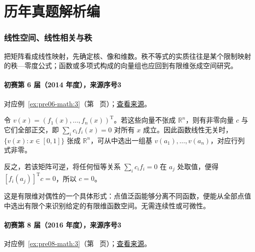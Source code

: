 \documentclass[UTF8,12pt,a4paper,fontset=fandol]{ctexart}
\begin{document}
\part{历年真题解析编}

\section{线性空间、线性相关与秩}

\label{sec:solutions-1}

把矩阵看成线性映射，先确定核、像和维数。秩不等式的实质往往是某个限制映射的秩—零度公式；函数或多项式构成的向量组也应回到有限维张成空间研究。

\subsection{初赛第 6 届（2014 年度），来源序号3}\label{ans:pre06-math:3}\label{pr:pre06-math:3}

对应例~\ref{ex:pre06-math:3}（第~\pageref{ex:pre06-math:3} 页）；\href{https://github.com/lzxcr/cmc-mathematics/blob/64916fa1fdbc3e444a652eca204d5669058ee321/src/problems/preliminary/06/03.md}{查看来源}。

\begin{solve}

令 $v(x)=(f_1(x),\ldots,f_n(x))^{\mathrm T}$。若这些向量不张成 $\mathbb R^n$，则有非零向量 $c$ 与它们全部正交，即 $\sum_ic_if_i(x)=0$ 对所有 $x$ 成立。因此函数线性无关时，$\{v(x):x\in[0,1]\}$ 张成 $\mathbb R^n$，可从中选出一组基 $v(a_1),\ldots,v(a_n)$，对应行列式非零。

反之，若该矩阵可逆，将任何恒等关系 $\sum_ic_if_i=0$ 在 $a_j$ 处取值，便得 $[f_i(a_j)]^{\mathrm T}c=0$，所以 $c=0$。

\end{solve}

\begin{remark}[方法与条件]

这是有限维对偶性的一个具体形式：点值泛函能够分离不同函数，便能从全部点值中选出有限个来识别给定的有限维函数空间。无需连续性或可微性。

\end{remark}

\subsection{初赛第 8 届（2016 年度），来源序号3}\label{ans:pre08-math:3}\label{pr:pre08-math:3}

对应例~\ref{ex:pre08-math:3}（第~\pageref{ex:pre08-math:3} 页）；\href{https://github.com/lzxcr/cmc-mathematics/blob/64916fa1fdbc3e444a652eca204d5669058ee321/src/problems/preliminary/08/03.md}{查看来源}。
\end{document}
